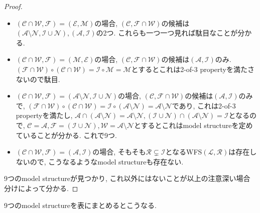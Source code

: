 \documentclass[. /main]{subfiles}
\theoremstyle{definition}
\begin{document}
\begin{proof}
\begin{itemize}
\item $(\mathcal{C} \cap \mathcal{W},  \mathcal{F})=(\mathcal{E},  \mathcal{M})$の場合, $(\mathcal{C},  \mathcal{F} \cap \mathcal{W})$の候補は$(\mathcal{A} \setminus \mathcal{N},  \mathcal{I} \cup \mathcal{N}),  (\mathcal{A},  \mathcal{I})$の2つ. これらも一つ一つ見れば駄目なことが分かる. 
\item $(\mathcal{C} \cap \mathcal{W},  \mathcal{F})=(\mathcal{M},  \mathcal{E})$の場合, $(\mathcal{C},  \mathcal{F} \cap \mathcal{W})$の候補は$(\mathcal{A},  \mathcal{I})$のみ. $(\mathcal{F} \cap \mathcal{W}) \circ (\mathcal{C} \cap \mathcal{W})=\mathcal{I} \circ \mathcal{M}=\mathcal{M}$とするとこれは2-of-3 propertyを満たさないので駄目. 
\item $(\mathcal{C} \cap \mathcal{W},  \mathcal{F})=(\mathcal{A} \setminus \mathcal{N},  \mathcal{I} \cup \mathcal{N})$の場合, $(\mathcal{C},  \mathcal{F} \cap \mathcal{W})$の候補は$(\mathcal{A},  \mathcal{I})$のみで, $(\mathcal{F} \cap \mathcal{W}) \circ (\mathcal{C} \cap \mathcal{W})=\mathcal{I} \circ (\mathcal{A} \setminus \mathcal{N})=\mathcal{A} \setminus \mathcal{N}$であり, これは2-of-3 propertyを満たし, $\mathcal{A} \cap (\mathcal{A} \setminus \mathcal{N})=\mathcal{A} \setminus \mathcal{N},  (\mathcal{I} \cup \mathcal{N}) \cap (\mathcal{A} \setminus \mathcal{N})=\mathcal{I}$となるので, $\mathcal{C}=\mathcal{A},  \mathcal{F}=(\mathcal{I} \cup \mathcal{N}),  \mathcal{W}=\mathcal{A} \setminus \mathcal{N}$とするとこれはmodel structureを定めていることが分かる. これで9つ. 
\item $(\mathcal{C} \cap \mathcal{W},  \mathcal{F})=(\mathcal{A},  \mathcal{I})$の場合, そもそも$\mathcal{R} \subsetneq \mathcal{I}$となるWFS$(\mathcal{L},  \mathcal{R})$は存在しないので, こうなるようなmodel structureも存在ない. 
\end{itemize}
9つのmodel structureが見つかり, これ以外にはないことが以上の注意深い場合分けによって分かる. 
\end{proof}
9つのmodel structureを表にまとめるとこうなる. 
\end{document}
